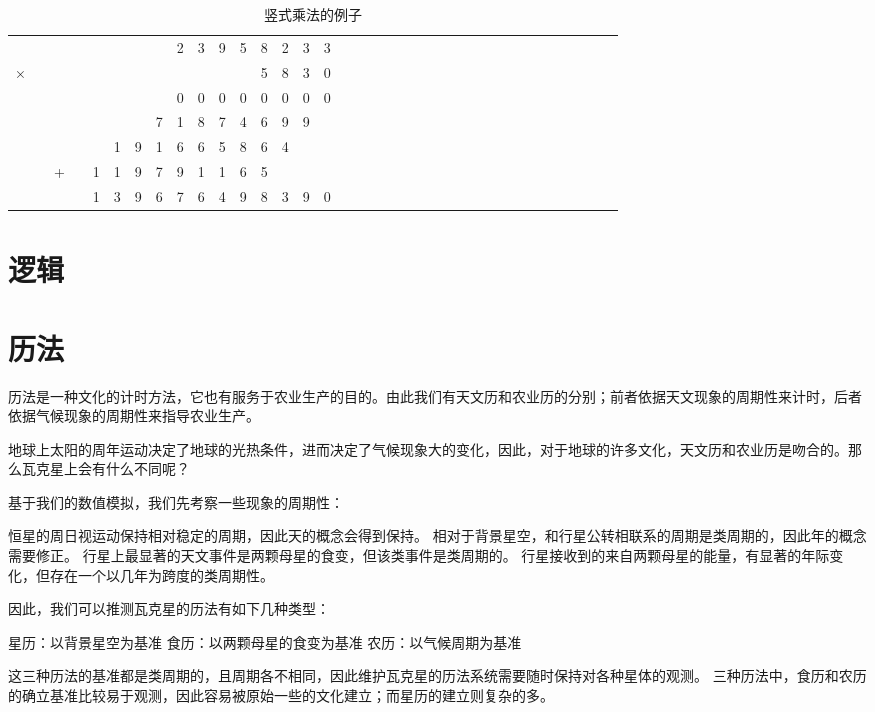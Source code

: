 \documentclass[a4paper,10.5pt]{book}
\begin{document}
\begin{table}[tbhp]
\centering
\begin{tabular}{cccccccccccccccccccccccccccccccccccc}
  &   &   &   &   &   &   &   & 2 & 3 & 9 & 5 & 8 & 2 & 3 & 3\\
× &   &   &   &   &   &   &   &   &   &   &   & 5 & 8 & 3 & 0\\
\hline
  &   &   &   &   &   &   &   & 0 & 0 & 0 & 0 & 0 & 0 & 0 & 0\\
  &   &   &   &   &   &   & 7 & 1 & 8 & 7 & 4 & 6 & 9 & 9 &  \\
  &   &   &   &   & 1 & 9 & 1 & 6 & 6 & 5 & 8 & 6 & 4 &   &  \\
  &   & + &   & 1 & 1 & 9 & 7 & 9 & 1 & 1 & 6 & 5 &   &   &  \\
\hline
  &   &   &   & 1 & 3 & 9 & 6 & 7 & 6 & 4 & 9 & 8 & 3 & 9 & 0\\
\end{tabular}
\caption{竖式乘法的例子}
\end{table}

\section{逻辑}

\section{历法}

历法是一种文化的计时方法，它也有服务于农业生产的目的。由此我们有天文历和农业历的分别；前者依据天文现象的周期性来计时，后者依据气候现象的周期性来指导农业生产。

地球上太阳的周年运动决定了地球的光热条件，进而决定了气候现象大的变化，因此，对于地球的许多文化，天文历和农业历是吻合的。那么瓦克星上会有什么不同呢？

基于我们的数值模拟，我们先考察一些现象的周期性：

恒星的周日视运动保持相对稳定的周期，因此天的概念会得到保持。
相对于背景星空，和行星公转相联系的周期是类周期的，因此年的概念需要修正。
行星上最显著的天文事件是两颗母星的食变，但该类事件是类周期的。
行星接收到的来自两颗母星的能量，有显著的年际变化，但存在一个以几年为跨度的类周期性。

因此，我们可以推测瓦克星的历法有如下几种类型：

星历：以背景星空为基准
食历：以两颗母星的食变为基准
农历：以气候周期为基准

这三种历法的基准都是类周期的，且周期各不相同，因此维护瓦克星的历法系统需要随时保持对各种星体的观测。
三种历法中，食历和农历的确立基准比较易于观测，因此容易被原始一些的文化建立；而星历的建立则复杂的多。
\end{document}

